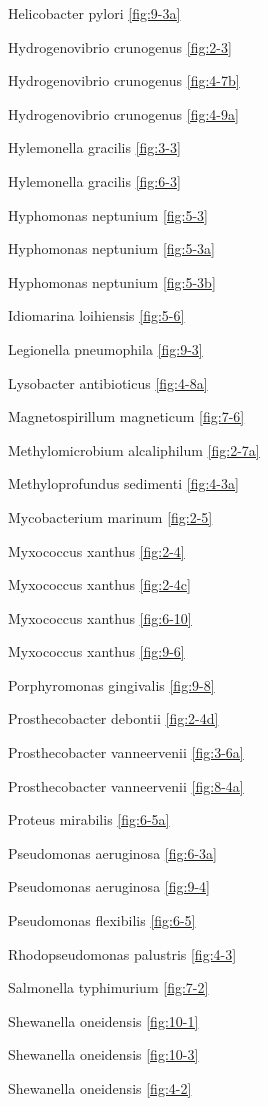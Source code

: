 \documentclass[]{tufte-book}
\begin{document}
Helicobacter pylori \ref{fig:9-3a}

Hydrogenovibrio crunogenus \ref{fig:2-3}

Hydrogenovibrio crunogenus \ref{fig:4-7b}

Hydrogenovibrio crunogenus \ref{fig:4-9a}

Hylemonella gracilis \ref{fig:3-3}

Hylemonella gracilis \ref{fig:6-3}

Hyphomonas neptunium \ref{fig:5-3}

Hyphomonas neptunium \ref{fig:5-3a}

Hyphomonas neptunium \ref{fig:5-3b}

Idiomarina loihiensis \ref{fig:5-6}

Legionella pneumophila \ref{fig:9-3}

Lysobacter antibioticus \ref{fig:4-8a}

Magnetospirillum magneticum \ref{fig:7-6}

Methylomicrobium alcaliphilum \ref{fig:2-7a}

Methyloprofundus sedimenti \ref{fig:4-3a}

Mycobacterium marinum \ref{fig:2-5}

Myxococcus xanthus \ref{fig:2-4}

Myxococcus xanthus \ref{fig:2-4c}

Myxococcus xanthus \ref{fig:6-10}

Myxococcus xanthus \ref{fig:9-6}

Porphyromonas gingivalis \ref{fig:9-8}

Prosthecobacter debontii \ref{fig:2-4d}

Prosthecobacter vanneervenii \ref{fig:3-6a}

Prosthecobacter vanneervenii \ref{fig:8-4a}

Proteus mirabilis \ref{fig:6-5a}

Pseudomonas aeruginosa \ref{fig:6-3a}

Pseudomonas aeruginosa \ref{fig:9-4}

Pseudomonas flexibilis \ref{fig:6-5}

Rhodopseudomonas palustris \ref{fig:4-3}

Salmonella typhimurium \ref{fig:7-2}

Shewanella oneidensis \ref{fig:10-1}

Shewanella oneidensis \ref{fig:10-3}

Shewanella oneidensis \ref{fig:4-2}
\end{document}

